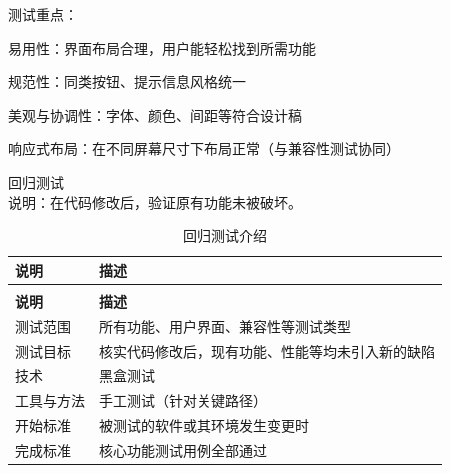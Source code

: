 \begin{levellist}
\begin{levellist}
\begin{levellist}
            测试重点：
            \begin{levellist}
                \item 易用性：界面布局合理，用户能轻松找到所需功能
                \item 规范性：同类按钮、提示信息风格统一
                \item 美观与协调性：字体、颜色、间距等符合设计稿
                \item 响应式布局：在不同屏幕尺寸下布局正常（与兼容性测试协同）
            \end{levellist}

            \item 回归测试  \\
            说明：在代码修改后，验证原有功能未被破坏。

            \begin{longtable}{>{\centering\arraybackslash}m{2.5cm} >{\centering\arraybackslash}m{12cm}}

                \caption{回归测试介绍} \label{tab:training}            \\

                \toprule
                \textbf{说明} & \textbf{描述}                        \\
                \midrule
                \endfirsthead

                \multicolumn{2}{c}{{\tablename\ \thetable{} 续表}} \\
                \toprule
                \textbf{说明} & \textbf{描述}                        \\
                \midrule
                \endhead

                \bottomrule
                \endfoot


                测试范围        & 所有功能、用户界面、兼容性等测试类型                 \\
                测试目标        & 核实代码修改后，现有功能、性能等均未引入新的缺陷           \\
                技术          & 黑盒测试                               \\
                工具与方法       & 手工测试（针对关键路径）                       \\
                开始标准        & 被测试的软件或其环境发生变更时                    \\
                完成标准        & 核心功能测试用例全部通过                       \\
            \end{longtable}



\end{levellist}
\end{levellist}
\end{levellist}
